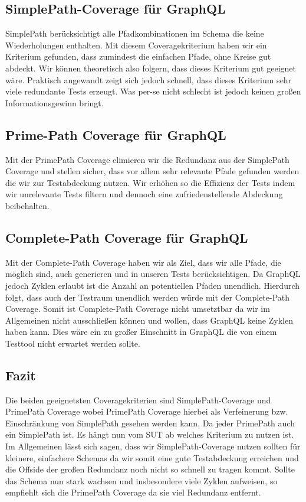 \subsection{SimplePath-Coverage für GraphQL}

SimplePath berücksichtigt alle Pfadkombinationen im Schema die keine Wiederholungen enthalten.
Mit diesem Coveragekriterium haben wir ein Kriterium gefunden, dass zumindest die einfachen Pfade, ohne Kreise gut abdeckt.
Wir können theoretisch also folgern, dass dieses Kriterium gut geeignet wäre.
Praktisch angewandt zeigt sich jedoch schnell, dass dieses Kriterium sehr viele redundante Tests erzeugt.
Was per-se nicht schlecht ist jedoch keinen großen Informationsgewinn bringt.

\subsection{Prime-Path Coverage für GraphQL}

Mit der PrimePath Coverage elimieren wir die Redundanz aus der SimplePath Coverage und stellen sicher, dass
vor allem sehr relevante Pfade gefunden werden die wir zur Testabdeckung nutzen.
Wir erhöhen so die Effizienz der Tests indem wir unrelevante Tests filtern und dennoch eine zufriedenstellende Abdeckung beibehalten.

\subsection{Complete-Path Coverage für GraphQL}

Mit der Complete-Path Coverage haben wir als Ziel, dass wir alle Pfade, die möglich sind, auch generieren und in unseren
Tests berücksichtigen.
Da GraphQL jedoch Zyklen erlaubt ist die Anzahl an potentiellen Pfaden unendlich.
Hierdurch folgt, dass auch der Testraum unendlich werden würde mit der Complete-Path Coverage.
Somit ist Complete-Path Coverage nicht umsetztbar da wir im Allgemeinen nicht ausschließen können und wollen, dass GraphQL
keine Zyklen haben kann.
Dies wäre ein zu großer Einschnitt in GraphQL die von einem Testtool nicht erwartet werden sollte.

\subsection{Fazit}

Die beiden geeignetsten Coveragekriterien sind SimplePath-Coverage und PrimePath Coverage wobei PrimePath Coverage hierbei
als Verfeinerung bzw. Einschränkung von SimplePath gesehen werden kann.
Da jeder PrimePath auch ein SimplePath ist.
Es hängt nun vom SUT ab welches Kriterium zu nutzen ist.
Im Allgemeinen lässt sich sagen, dass wir SimplePath-Coverage nutzen sollten für kleinere, einfachere Schemas da
wir somit eine gute Testabdeckung erreichen und die Offside der großen Redundanz noch nicht so schnell zu tragen kommt.
Sollte das Schema nun stark wachsen und insbesondere viele Zyklen aufweisen, so empfiehlt sich die PrimePath Coverage da
sie viel Redundanz entfernt.
